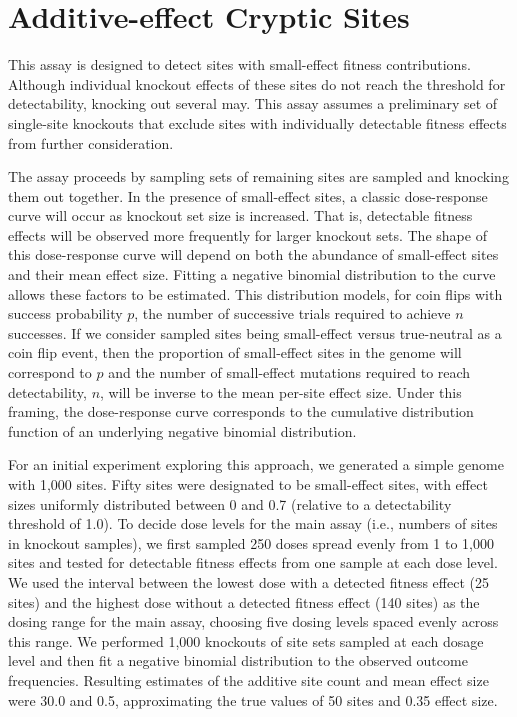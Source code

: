 \section{Additive-effect Cryptic Sites}

This assay is designed to detect sites with small-effect fitness contributions.
Although individual knockout effects of these sites do not reach the threshold for detectability, knocking out several may.
This assay assumes a preliminary set of single-site knockouts that exclude sites with individually detectable fitness effects from further consideration.

The assay proceeds by sampling sets of remaining sites are sampled and knocking them out together.
In the presence of small-effect sites, a classic dose-response curve will occur as knockout set size is increased.
That is, detectable fitness effects will be observed more frequently for larger knockout sets.
The shape of this dose-response curve will depend on both the abundance of small-effect sites and their mean effect size.
Fitting a negative binomial distribution to the curve allows these factors to be estimated.
This distribution models, for coin flips with success probability $p$, the number of successive trials required to achieve $n$ successes.
If we consider sampled sites being small-effect versus true-neutral as a coin flip event, then the proportion of small-effect sites in the genome will correspond to $p$ and the number of small-effect mutations required to reach detectability, $n$, will be inverse to the mean per-site effect size.
Under this framing, the dose-response curve corresponds to the cumulative distribution function of an underlying negative binomial distribution.

For an initial experiment exploring this approach, we generated a simple genome with 1,000 sites.
Fifty sites were designated to be small-effect sites, with effect sizes uniformly distributed between 0 and 0.7 (relative to a detectability threshold of 1.0).
To decide dose levels for the main assay (i.e., numbers of sites in knockout samples), we first sampled 250 doses spread evenly from 1 to 1,000 sites and tested for detectable fitness effects from one sample at each dose level.
We used the interval between the lowest dose with a detected fitness effect (25 sites) and the highest dose without a detected fitness effect (140 sites) as the dosing range for the main assay, choosing five dosing levels spaced evenly across this range.
We performed 1,000 knockouts of site sets sampled at each dosage level and then fit a negative binomial distribution to the observed outcome frequencies.
Resulting estimates of the additive site count and mean effect size were 30.0 and 0.5, approximating the true values of 50 sites and 0.35 effect size.

